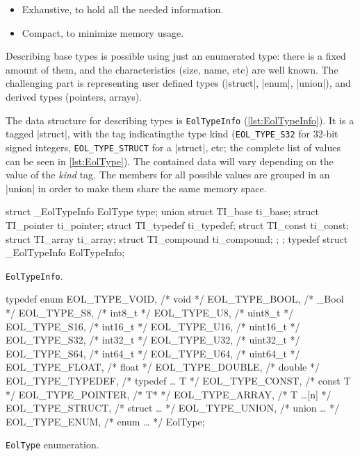 \begin{itemize}
  \item Exhaustive, to hold all the needed information.
  \item Compact, to minimize memory usage.
\end{itemize}

Describing base types is possible using just an enumerated type: there is
a fixed amount of them, and the characteristics (size, name, etc) are well
known. The challenging part is representing user defined types (\Mc|struct|,
\Mc|enum|, \Mc|union|), and derived types (pointers, arrays).

The data structure for describing types is \verb|EolTypeInfo|
(\autoref{lst:EolTypeInfo}). It is a tagged \Mc|struct|, with the tag
indicatingthe type kind (\verb|EOL_TYPE_S32| for 32-bit signed integers,
\verb|EOL_TYPE_STRUCT| for a \Mc|struct|, etc; the complete list of values
can be seen in \autoref{lst:EolType}). The contained data will vary
depending on the value of the \emph{kind} tag. The members for all possible
values are grouped in an \Mc|union| in order to make them share the
same memory space.

\begin{listing}[H]
  \begin{ccode}
    struct _EolTypeInfo {
      EolType type;
      union {
        struct TI_base     ti_base;
        struct TI_pointer  ti_pointer;
        struct TI_typedef  ti_typedef;
        struct TI_const    ti_const;
        struct TI_array    ti_array;
        struct TI_compound ti_compound;
      };
    };
    typedef struct _EolTypeInfo EolTypeInfo;
  \end{ccode}
  \caption{\texttt{EolTypeInfo}.}
  \label{lst:EolTypeInfo}
\end{listing}

\begin{listing}[tH]
  \centering
  \begin{ccode}
    typedef enum {
      EOL_TYPE_VOID,    /* void        */
      EOL_TYPE_BOOL,    /* _Bool       */
      EOL_TYPE_S8,      /* int8_t      */
      EOL_TYPE_U8,      /* uint8_t     */
      EOL_TYPE_S16,     /* int16_t     */
      EOL_TYPE_U16,     /* uint16_t    */
      EOL_TYPE_S32,     /* int32_t     */
      EOL_TYPE_U32,     /* uint32_t    */
      EOL_TYPE_S64,     /* int64_t     */
      EOL_TYPE_U64,     /* uint64_t    */
      EOL_TYPE_FLOAT,   /* float       */
      EOL_TYPE_DOUBLE,  /* double      */
      EOL_TYPE_TYPEDEF, /* typedef … T */
      EOL_TYPE_CONST,   /* const T     */
      EOL_TYPE_POINTER, /* T*          */
      EOL_TYPE_ARRAY,   /* T …[n]      */
      EOL_TYPE_STRUCT,  /* struct …    */
      EOL_TYPE_UNION,   /* union …     */
      EOL_TYPE_ENUM,    /* enum …      */
    } EolType;
  \end{ccode}
  \caption{\texttt{EolType} enumeration.}
  \label{lst:EolType}
\end{listing}



